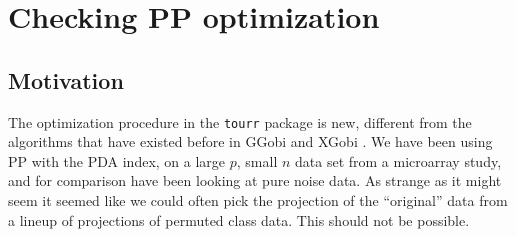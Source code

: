 \documentclass[12]{report}
\begin{document}
%
%
%
%
%
%
%

\section{Checking PP optimization} \label{sec:largep}

\subsection{Motivation}

The optimization procedure in the  \texttt{tourr} package is new, different from the algorithms that have existed before in GGobi \cite{STLBC03} and XGobi \cite{SCB91}. 
We have been using PP with the PDA index, on a large $p$, small $n$ data set from a microarray study, and for comparison have been looking at pure noise data. As strange as it might seem it seemed like we could often pick the projection of the  ``original'' data from a lineup of projections of permuted class data. This should not be possible. 
\end{document}
